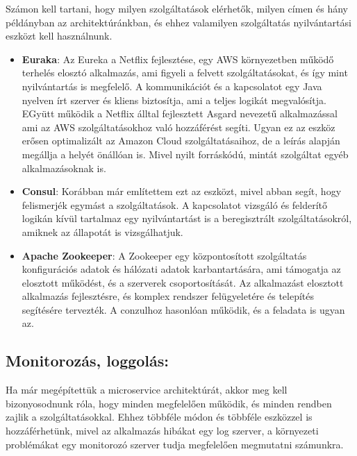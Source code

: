 \documentclass[11pt,magyar,a4paper,oneside,]{report}
\begin{document}
Számon kell tartani, hogy milyen szolgáltatások elérhetők, milyen címen
és hány példányban az architektúránkban, és ehhez valamilyen
szolgáltatás nyilvántartási eszközt kell használnunk.

\begin{itemize}
\item
  \textbf{Euraka}: Az Eureka a Netflix fejlesztése, egy AWS környezetben
  működő terhelés elosztó alkalmazás, ami figyeli a felvett
  szolgáltatásokat, és így mint nyilvántartás is megfelelő. A
  kommunikációt és a kapcsolatot egy Java nyelven írt szerver és kliens
  biztosítja, ami a teljes logikát megvalósítja. EGyütt működik a
  Netflix álltal fejlesztett Asgard nevezetű alkalmazással ami az AWS
  szolgáltatásokhoz való hozzáférést segíti. Ugyan ez az eszköz erősen
  optimalizált az Amazon Cloud szolgáltatásaihoz, de a leírás alapján
  megállja a helyét önállóan is. Mivel nyilt forráskódú, mintát
  szolgáltat egyéb alkalmazásoknak is.
\item
  \textbf{Consul}: Korábban már említettem ezt az eszközt, mivel abban
  segít, hogy felismerjék egymást a szolgáltatások. A kapcsolatot
  vizsgáló és felderítő logikán kívül tartalmaz egy nyilvántartást is a
  beregisztrált szolgáltatásokról, amiknek az állapotát is
  vizsgálhatjuk.
\item
  \textbf{Apache Zookeeper}: A Zookeeper egy központosított szolgáltatás
  konfigurációs adatok és hálózati adatok karbantartására, ami támogatja
  az elosztott működést, és a szerverek csoportosítását. Az alkalmazást
  elosztott alkalmazás fejlesztésre, és komplex rendszer felügyeletére
  és telepítés segítésére tervezték. A conzulhoz hasonlóan működik, és a
  feladata is ugyan az.
\end{itemize}

\subsection{Monitorozás, loggolás:}\label{monitorozuxe1s-loggoluxe1s}

Ha már megépítettük a microservice architektúrát, akkor meg kell
bizonyosodnunk róla, hogy minden megfelelően működik, és minden rendben
zajlik a szolgáltatásokkal. Ehhez többféle módon és többféle eszközzel
is hozzáférhetünk, mivel az alkalmazás hibákat egy log szerver, a
környezeti problémákat egy monitorozó szerver tudja megfelelően
megmutatni számunkra.
\end{document}
